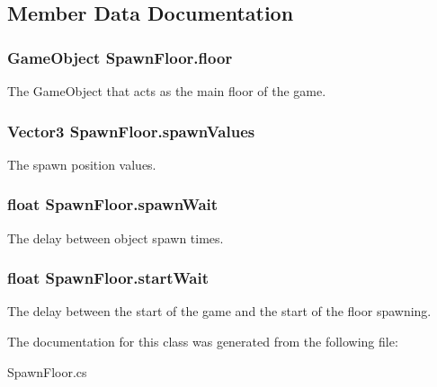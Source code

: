 \subsection{Member Data Documentation}
\hypertarget{classSpawnFloor_a5c0ce5e6b89553960340b1a108ef49d6}{
\subsubsection[{floor}]{\setlength{\rightskip}{0pt plus 5cm}Game\-Object Spawn\-Floor.\-floor}}\label{classSpawnFloor_a5c0ce5e6b89553960340b1a108ef49d6}


The Game\-Object that acts as the main floor of the game. 

\hypertarget{classSpawnFloor_ade77f9840ef3b18a4f2fb12ef8f16b61}{
\subsubsection[{spawn\-Values}]{\setlength{\rightskip}{0pt plus 5cm}Vector3 Spawn\-Floor.\-spawn\-Values}}\label{classSpawnFloor_ade77f9840ef3b18a4f2fb12ef8f16b61}


The spawn position values. 

\hypertarget{classSpawnFloor_abbc700e5d578b3317400424919914a71}{
\subsubsection[{spawn\-Wait}]{\setlength{\rightskip}{0pt plus 5cm}float Spawn\-Floor.\-spawn\-Wait}}\label{classSpawnFloor_abbc700e5d578b3317400424919914a71}


The delay between object spawn times. 

\hypertarget{classSpawnFloor_a3ed022cb29f19385586cbb4eccfca523}{
\subsubsection[{start\-Wait}]{\setlength{\rightskip}{0pt plus 5cm}float Spawn\-Floor.\-start\-Wait}}\label{classSpawnFloor_a3ed022cb29f19385586cbb4eccfca523}


The delay between the start of the game and the start of the floor spawning. 



The documentation for this class was generated from the following file\-:\begin{DoxyCompactItemize}
\item 
Spawn\-Floor.\-cs\end{DoxyCompactItemize}
